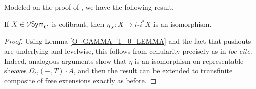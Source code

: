 \documentclass[a4paper,10pt]{article}%
\begin{document}

Modeled on the proof of \cite[Theorem 2.10]{Ste16}, we have the following result.
\begin{proposition}
 If $X\in \mathcal V\mathsf{Sym}_G$ is cofibrant, then $\eta_X: X \to i_*i^*X$ is an isomorphism.
\end{proposition}
\begin{proof}
  Using Lemma \ref{O_GAMMA_T_0_LEMMA} and the fact that pushouts are underlying and levelwise, this follows from cellularity precisely as in \textit{loc cite}. Indeed, analogous arguments show that $\eta$ is an isomorphism on representable sheaves $\Omega_G(-,T)\cdot A$, and then the result can be extended to transfinite composite of free extensions exactly as before.

\end{proof}
\end{document}
